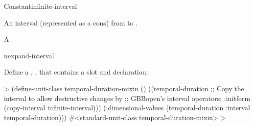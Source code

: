 \documentclass[10pt,twoside,english,pdftex]{article}
\begin{document}
\begin{functiondoc}{Constant}{infinite-interval}{}%

\fnsyntax

\fnpurpose An interval (represented as a cons) from  to
.

\fnpackage {}

\fnmodule {}

\fnvaluetype A 

\fnvalue {}

\begin{alsos}{nexpand-interval}
\end{alsos}

\fnexample
%
%
%
%
Define a , , that
contains a  slot and 
declaration:
%
\W\supp
\begin{example}
  > (define-unit-class temporal-duration-mixin ()
      ((temporal-duration 
         ;; Copy the interval to allow destructive changes by
         ;; GBBopen's interval operators:
         :initform (copy-interval infinite-interval)))
      (:dimensional-values
       (temporal-duration :interval temporal-duration)))
  #<standard-unit-class temporal-duration-mixin>
  >
\end{example}

\end{functiondoc}

\end{document}
